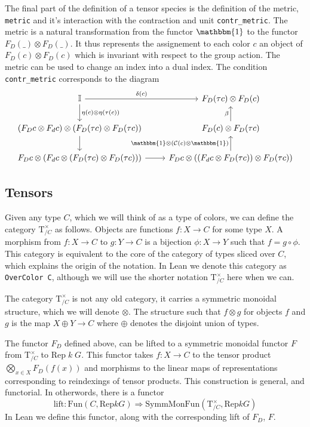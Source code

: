 \documentclass[a4paper, 11pt]{article}
\newcommand{\Rep}[2]{\mathrm{Rep} \; #1 \; #2}
\begin{document}
The final part of the definition of a tensor species is the definition of the metric, \lstinline|metric| 
and it's interaction with the contraction and unit \lstinline|contr_metric|. 
The metric is a natural transformation from the functor $\mathbbm{1}$
to the functor $F_D(\_) \otimes F_D (\_)$. It thus represents the assignement to each color $c$ an object of
$F_D(c) \otimes F_D (c)$ which is invariant with respect to the group action.
The metric can be used to change an index into a dual index. The condition \lstinline|contr_metric|
corresponds to the diagram 
\begin{equation}
  \begin{tikzcd}
    \mathbb{I} \arrow[r, "{\delta(c)}"] \arrow[d, "{\eta(c)\otimes \eta(\tau(c))}"] & F_D(\tau c) \otimes F_D (c) \\ 
    (F_D c \otimes F_d c) \otimes (F_D (\tau c) \otimes F_D (\tau c) ) \arrow [d]  & F_D (c) \otimes F_D(\tau c) \arrow[u, "{\beta}"] \\ 
    F_D c \otimes (F_d c \otimes (F_D (\tau c) \otimes F_D (\tau c) )) \arrow [r] &  F_D c \otimes ((F_d c \otimes F_D (\tau c)) \otimes F_D (\tau c) ) \arrow[u, "{\mathbbm{1} \otimes(\mathcal{C}(c) \otimes \mathbbm{1})}"]
  \end{tikzcd}
\end{equation}

\subsection{Tensors} 

Given any type $C$, which we will think of as a type of colors, we can define 
the category $\mathrm{T}_{/C}^\times$ as follows. Objects are functions 
$f : X \to C$ for some type $X$. A morphism from $f : X \to C$ to $g : Y \to C$ is a bijection
$\phi : X \to Y$ such that $f = g \circ \phi$. This category is equivalent to the core of the
category of types sliced over $C$, which explains the origin of the notation. 
In Lean we denote this category as \lstinline|OverColor C|, although we will use the 
shorter notation $\mathrm{T}_{/C}^\times$ here when we can.

The category $\mathrm{T}_{/C}^\times$ is not any old category, it carries a symmetric monoidal structure, 
which we will denote $\otimes$. The structure such that $f \otimes g$ for objects $f$ and $g$ 
is the map $X \oplus Y \to C$ where $\oplus$ denotes the disjoint union of types. 

The functor $F_D$ defined above, can be lifted to a symmetric monoidal functor $F$ from 
$\mathrm{T}_{/C}^\times$ to $\Rep k G$. This functor takes $f : X \to C$ to the tensor product
$\bigotimes_{x \in X} F_D(f(x))$ and morphisms to the linear maps of representations corresponding to
reindexings of tensor products. This construction is general, and functorial. In otherwords, 
there is a functor 
\begin{equation}
  \mathrm{lift} : \mathrm{Fun}(C, \mathrm{Rep} k G) \Rightarrow
  \mathrm{SymmMonFun}(\mathrm{T}_{/C}^\times, \mathrm{Rep} k G)
\end{equation} 
In Lean we define this functor, along with the corresponding lift of $F_D$, $F$.
\end{document}
